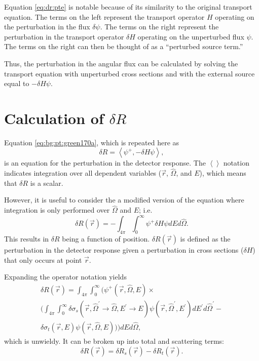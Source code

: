 Equation \ref{eq:dr:pte} is notable because of its similarity to the original transport equation.
The terms on the left represent the transport operator $H$ operating on the perturbation in the flux $\delta\psi$.
The terms on the right represent the perturbation in the transport operator $\delta H$ operating on the unperturbed flux $\psi$.
The terms on the right can then be thought of as a ``perturbed source term.''

Thus, the perturbation in the angular flux can be calculated by solving the transport equation with unperturbed cross sections and with the external source equal to $-\delta H\psi$.

\section{Calculation of $\delta R$}
\label{sec:dr:dr}

Equation \ref{eq:bg:pt:green170a}, which is repeated here as
\begin{equation}\label{eq:dr:dr_operator}
  \delta R = \left<\psi^+,-\delta H\psi\right>,
\end{equation}
is an equation for the perturbation in the detector response.
The $\left<\right>$ notation indicates integration over all dependent variables ($\vec{r}$, $\hat{\Omega}$, and $E$), which means that $\delta R$ is a scalar.

However, it is useful to consider the a modified version of the equation where integration is only performed over $\hat{\Omega}$ and $E$; i.e.
\begin{equation}\label{eq:dr:dr_pos}
  \delta R\left(\vec{r}\right) =
  -\int_{4\pi}\int_0^\infty\psi^+\delta H\psi dEd\hat{\Omega}.
\end{equation}
This results in $\delta R$ being a function of position.
$\delta R\left(\vec{r}\right)$ is defined as the perturbation in the detector response given a perturbation in cross sections ($\delta H$) that only occurs at point $\vec{r}$.

Expanding the operator notation yields
\begin{multline}\label{eq:dr:dr_pos_expand}
  \delta R\left(\vec{r}\right) =
  \int_{4\pi}\int_0^\infty\Biggl(\psi^+\left(\vec{r},\hat{\Omega},E\right) \times \\
  \Biggl(\int_{4\pi}\int_0^\infty\delta\sigma_s\left(\vec{r},\hat{\Omega}^\prime\rightarrow\hat{\Omega},E^\prime\rightarrow E\right)\psi\left(\vec{r},\hat{\Omega}^\prime,E^\prime\right)dE^\prime d\hat{\Omega}^\prime - \\
  \delta\sigma_t\left(\vec{r},E\right)\psi\left(\vec{r},\hat{\Omega},E\right)\Biggr)\Biggr)dEd\hat{\Omega},
\end{multline}
which is unwieldy.
It can be broken up into total and scattering terms:
\begin{equation}\label{eq:dr:dr_terms}
  \delta R\left(\vec{r}\right) =
  \delta R_s\left(\vec{r}\right) -
  \delta R_t\left(\vec{r}\right).
\end{equation}

